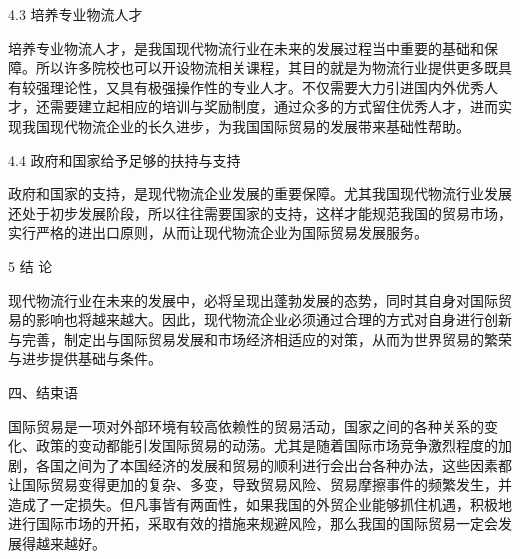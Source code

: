 4.3 培养专业物流人才

培养专业物流人才，是我国现代物流行业在未来的发展过程当中重要的基础和保障。所以许多院校也可以开设物流相关课程，其目的就是为物流行业提供更多既具有较强理论性，又具有极强操作性的专业人才。不仅需要大力引进国内外优秀人才，还需要建立起相应的培训与奖励制度，通过众多的方式留住优秀人才，进而实现我国现代物流企业的长久进步，为我国国际贸易的发展带来基础性帮助。

4.4 政府和国家给予足够的扶持与支持

政府和国家的支持，是现代物流企业发展的重要保障。尤其我国现代物流行业发展还处于初步发展阶段，所以往往需要国家的支持，这样才能规范我国的贸易市场，实行严格的进出口原则，从而让现代物流企业为国际贸易发展服务。

5 结 论

现代物流行业在未来的发展中，必将呈现出蓬勃发展的态势，同时其自身对国际贸易的影响也将越来越大。因此，现代物流企业必须通过合理的方式对自身进行创新与完善，制定出与国际贸易发展和市场经济相适应的对策，从而为世界贸易的繁荣与进步提供基础与条件。


四、结束语

国际贸易是一项对外部环境有较高依赖性的贸易活动，国家之间的各种关系的变化、政策的变动都能引发国际贸易的动荡。尤其是随着国际市场竞争激烈程度的加剧，各国之间为了本国经济的发展和贸易的顺利进行会出台各种办法，这些因素都让国际贸易变得更加的复杂、多变，导致贸易风险、贸易摩擦事件的频繁发生，并造成了一定损失。但凡事皆有两面性，如果我国的外贸企业能够抓住机遇，积极地进行国际市场的开拓，采取有效的措施来规避风险，那么我国的国际贸易一定会发展得越来越好。
